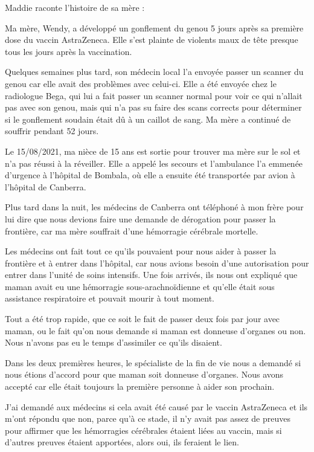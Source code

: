 Maddie raconte l'histoire de sa mère :

Ma mère, Wendy, a développé un gonflement du genou 5 jours après sa première
dose du vaccin AstraZeneca. Elle s'est plainte de violents maux de tête presque
tous les jours après la vaccination.

Quelques semaines plus tard, son médecin local l'a envoyée passer un scanner du
genou car elle avait des problèmes avec celui-ci. Elle a été envoyée chez le
radiologue Bega, qui lui a fait passer un scanner normal pour voir ce qui
n'allait pas avec son genou, mais qui n'a pas su faire des scans corrects pour
déterminer si le gonflement soudain était dû à un caillot de sang. Ma mère a
continué de souffrir pendant 52 jours.

Le 15/08/2021, ma nièce de 15 ans est sortie pour trouver ma mère sur le sol et
n'a pas réussi à la réveiller. Elle a appelé les secours et l'ambulance l'a
emmenée d'urgence à l'hôpital de Bombala, où elle a ensuite été transportée par
avion à l'hôpital de Canberra.

Plus tard dans la nuit, les médecins de Canberra ont téléphoné à mon frère pour
lui dire que nous devions faire une demande de dérogation pour passer la
frontière, car ma mère souffrait d'une hémorragie cérébrale mortelle.

Les médecins ont fait tout ce qu'ils pouvaient pour nous aider à passer la
frontière et à entrer dans l'hôpital, car nous avions besoin d'une autorisation
pour entrer dans l'unité de soins intensifs. Une fois arrivés, ils nous ont
expliqué que maman avait eu une hémorragie sous-arachnoïdienne et qu'elle était
sous assistance respiratoire et pouvait mourir à tout moment.

Tout a été trop rapide, que ce soit le fait de passer deux fois par jour avec
maman, ou le fait qu'on nous demande si maman est donneuse d'organes ou
non. Nous n'avons pas eu le temps d'assimiler ce qu'ils disaient.

Dans les deux premières heures, le spécialiste de la fin de vie nous a demandé
si nous étions d'accord pour que maman soit donneuse d'organes. Nous avons
accepté car elle était toujours la première personne à aider son prochain.

J'ai demandé aux médecins si cela avait été causé par le vaccin AstraZeneca et
ils m'ont répondu que non, parce qu'à ce stade, il n'y avait pas assez de
preuves pour affirmer que les hémorragies cérébrales étaient liées au vaccin,
mais si d'autres preuves étaient apportées, alors oui, ils feraient le lien.

